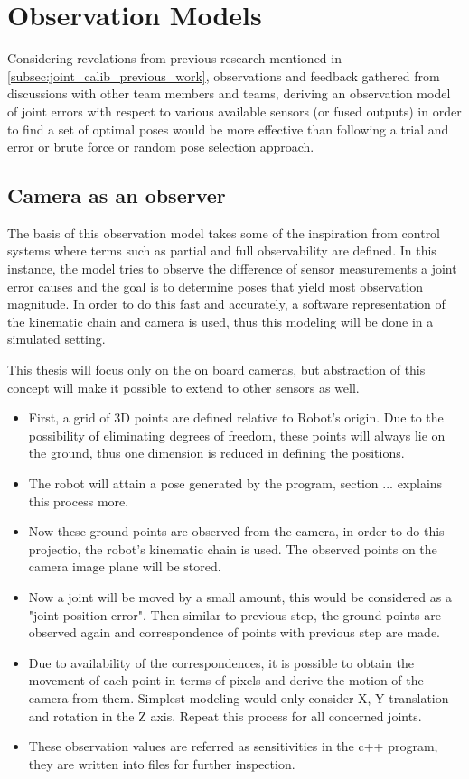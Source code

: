 \documentclass[english, printversion, nomenclature, notitle]{tuvisionthesis} %
\makeatletter
\renewcommand{\todo}[2][]{\tikzexternaldisable\@todo[#1]{#2}\tikzexternalenable}
\makeatother
\begin{document}
\section{Observation Models}
Considering revelations from previous research mentioned in \cref{subsec:joint_calib_previous_work}, observations and feedback gathered from discussions with other team members and teams, deriving an observation model of joint errors with respect to various available sensors (or fused outputs) in order to find a set of optimal poses would be more effective than following a trial and error or brute force or random pose selection approach.

\subsection{Camera as an observer}

\todo{move to methodology}

The basis of this observation model takes some of the inspiration from control systems where terms such as partial and full observability are defined. In this instance, the model tries to observe the difference of sensor measurements a joint error causes and the goal is to determine poses that yield most observation magnitude. In order to do this fast and accurately, a software representation of the kinematic chain and camera is used, thus this modeling will be done in a simulated setting.

This thesis will focus only on the on board cameras, but abstraction of this concept will make it possible to extend to other sensors as well.

\begin{itemize}
	\item First, a grid of 3D points are defined relative to Robot's origin. Due to the possibility of eliminating degrees of freedom, these points will always lie on the ground, thus one dimension is reduced in defining the positions.
	\item The robot will attain a pose generated by the program, section ... \todo{ref} explains this process more.
	\item Now these ground points are observed from the camera, in order to do this projectio, the robot's kinematic chain is used. The observed points on the camera image plane will be stored.
	\item Now a joint will be moved by a small amount, this would be considered as a "joint position error". Then similar to previous step, the ground points are observed again and correspondence of points with previous step are made.
	\item Due to availability of the correspondences, it is possible to obtain the movement of each point in terms of pixels and derive the motion of the camera from them. Simplest modeling would only consider X, Y translation and rotation in the Z axis. Repeat this process for all concerned joints.
	\item These observation values are referred as sensitivities in the c++ program, they are written into files for further inspection.	
\end{itemize}
\end{document}
